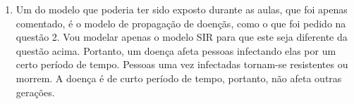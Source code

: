 \documentclass[a4paper]{article}
\begin{document}
\begin{enumerate}
\\
\item
Um do modelo que poderia ter sido exposto durante as aulas, que foi apenas comentado, \'e o modelo de propaga\c{c}\~ao de doen\c{c}\~as, como o que foi pedido na quest\~ao 2. Vou modelar apenas o modelo SIR para que este seja diferente da quest\~ao acima. Portanto, um doen\c{c}a afeta pessoas infectando elas por um certo per\'iodo de tempo. Pessoas uma vez infectadas tornam-se resistentes ou morrem. A doen\c{c}a \'e de curto per\'iodo de tempo, portanto, n\~ao afeta outras gera\c{c}\~oes.
\\
\end{enumerate}
\end{document}
